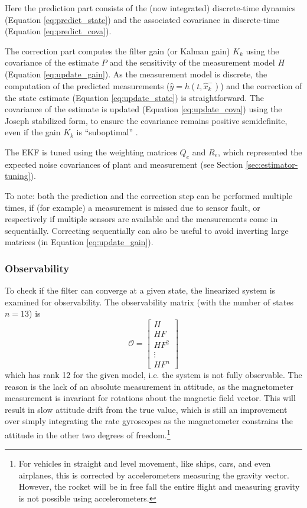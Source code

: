 Here the prediction part consists of the (now integrated) discrete-time dynamics (Equation \ref{eq:predict_state}) and the associated covariance in discrete-time (Equation \ref{eq:predict_cova}).

The correction part computes the filter gain (or Kalman gain) $K_k$ using the covariance of the estimate $P$ and the sensitivity of the measurement model $H$ (Equation \ref{eq:update_gain}).
As the measurement model is discrete, the computation of the predicted measurements ($\hat y = h(t,\hat x_k^-)$) and the correction of the state estimate (Equation \ref{eq:update_state}) is straightforward.
The covariance of the estimate is updated  (Equation \ref{eq:update_cova}) using the Joseph stabilized form, to ensure the covariance remains positive semidefinite, even if the gain $K_k$ is ``suboptimal'' \cite{lewis2008}.

The EKF is tuned using the weighting matrices $Q_e$ and $R_e$, which represented the expected noise covariances of plant and measurement (see Section \ref{sec:estimator-tuning}).

To note: both the prediction and the correction step can be performed multiple times, if (for example) a measurement is missed due to sensor fault, or respectively if multiple sensors are available and the measurements come in sequentially.
Correcting sequentially can also be useful to avoid inverting large matrices (in Equation \ref{eq:update_gain}).

\subsubsection{Observability}
To check if the filter can converge at a given state, the linearized system is examined for observability.
The observability matrix (with the number of states $n=13$) is 
\begin{equation}
    \mathcal{O} = \begin{bmatrix}
        H \\ H F \\ H F^2 \\ \vdots \\ H F^n
    \end{bmatrix}
\end{equation}
which has rank 12 for the given model, i.e. the system is not fully observable. 
The reason is the lack of an absolute measurement in attitude, as the magnetometer measurement is invariant for rotations about the magnetic field vector. 
This will result in slow attitude drift from the true value, which is still an improvement over simply integrating the rate gyroscopes as the magnetometer constrains the attitude in the other two degrees of freedom.\footnote{For vehicles in straight and level movement, like ships, cars, and even airplanes, this is corrected by accelerometers measuring the gravity vector. However, the rocket will be in free fall the entire flight and measuring gravity is not possible using accelerometers.}

